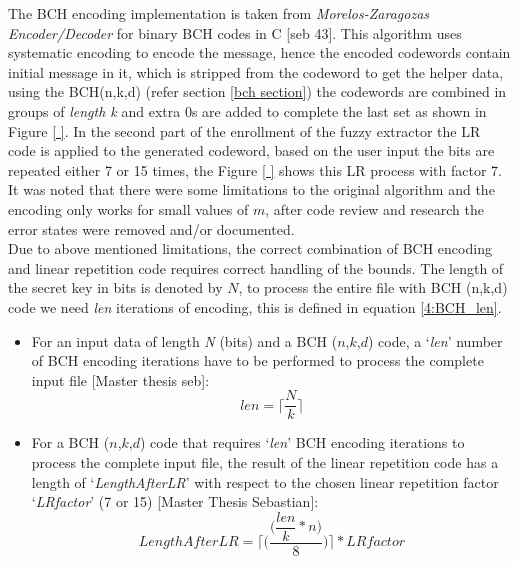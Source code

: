 The BCH encoding implementation is taken from \emph{Morelos-Zaragozas Encoder/Decoder} for binary BCH codes in C [seb 43]. This algorithm uses systematic encoding to encode the message, hence the encoded codewords contain initial message in it, which is stripped from the codeword to get the helper data, using the BCH(n,k,d) (refer section \ref{bch section}) the codewords are combined in groups of \emph{length k} and extra 0s are added to complete the last set as shown in Figure \ref{ }. In the
second part of the enrollment of the fuzzy extractor the LR code is applied to the generated codeword, based on the user input the bits are repeated either 7 or 15 times, the Figure \ref{ } shows this LR process with factor 7. It was noted that there were some limitations to the original algorithm and the encoding only works for small values of $m$, after code review and research the error states were removed and/or documented.\\

Due to above mentioned limitations, the correct combination of BCH encoding and linear repetition code requires correct handling of the bounds. The length of the secret key in bits is denoted by $N$, to process the entire file with BCH (n,k,d) code we need \emph{len} iterations of encoding, this is defined in equation \ref{4:BCH_len}.

\begin{itemize}
	\item For an input data of length \emph{N} (bits) and a BCH ($n$,$k$,$d$) code, a ‘\emph{len}’ number of BCH encoding iterations have to be performed to process the complete input file [Master thesis seb]:
\begin{equation}
	len =\Bigg\lceil\dfrac{N}{k}\Bigg\rceil
	\label{4:BCH_len}
\end{equation}

\item For a BCH ($n$,$k$,$d$) code that requires ‘\emph{len}’ BCH encoding iterations to process the complete input file, the result of the linear repetition code has a length of ‘\emph{LengthAfterLR}’ with respect to the chosen linear repetition factor ‘\emph{LRfactor}’ (7 or 15) [Master Thesis Sebastian]:
\begin{equation}
	LengthAfterLR = \Bigg\lceil\Bigg(\dfrac{\Bigg(\dfrac{len}{k} * n\Bigg)}{8}\Bigg)\Bigg\rceil * LRfactor
\label{4:BCH_LR_len}
\end{equation}
\end{itemize}

